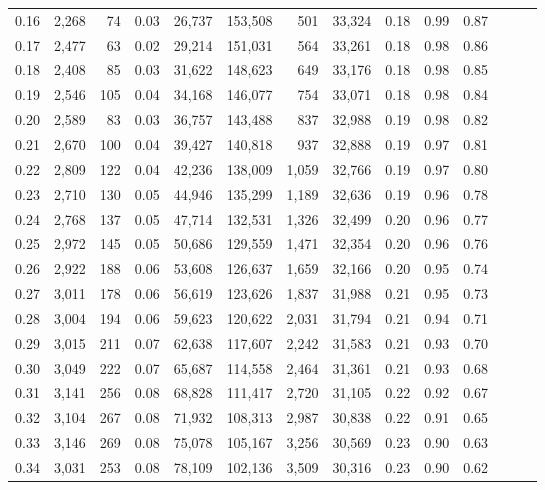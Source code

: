 \begin{tabular}{rrrrrrrrrrrrrr}
0.16 &  2,268 &   74 &  0.03 &   26,737 &  153,508 &     501 &  33,324 &  0.18 &  0.99 &      0.87 \\
0.17 &  2,477 &   63 &  0.02 &   29,214 &  151,031 &     564 &  33,261 &  0.18 &  0.98 &      0.86 \\
0.18 &  2,408 &   85 &  0.03 &   31,622 &  148,623 &     649 &  33,176 &  0.18 &  0.98 &      0.85 \\
0.19 &  2,546 &  105 &  0.04 &   34,168 &  146,077 &     754 &  33,071 &  0.18 &  0.98 &      0.84 \\
0.20 &  2,589 &   83 &  0.03 &   36,757 &  143,488 &     837 &  32,988 &  0.19 &  0.98 &      0.82 \\
0.21 &  2,670 &  100 &  0.04 &   39,427 &  140,818 &     937 &  32,888 &  0.19 &  0.97 &      0.81 \\
0.22 &  2,809 &  122 &  0.04 &   42,236 &  138,009 &   1,059 &  32,766 &  0.19 &  0.97 &      0.80 \\
0.23 &  2,710 &  130 &  0.05 &   44,946 &  135,299 &   1,189 &  32,636 &  0.19 &  0.96 &      0.78 \\
0.24 &  2,768 &  137 &  0.05 &   47,714 &  132,531 &   1,326 &  32,499 &  0.20 &  0.96 &      0.77 \\
0.25 &  2,972 &  145 &  0.05 &   50,686 &  129,559 &   1,471 &  32,354 &  0.20 &  0.96 &      0.76 \\
0.26 &  2,922 &  188 &  0.06 &   53,608 &  126,637 &   1,659 &  32,166 &  0.20 &  0.95 &      0.74 \\
0.27 &  3,011 &  178 &  0.06 &   56,619 &  123,626 &   1,837 &  31,988 &  0.21 &  0.95 &      0.73 \\
0.28 &  3,004 &  194 &  0.06 &   59,623 &  120,622 &   2,031 &  31,794 &  0.21 &  0.94 &      0.71 \\
0.29 &  3,015 &  211 &  0.07 &   62,638 &  117,607 &   2,242 &  31,583 &  0.21 &  0.93 &      0.70 \\
0.30 &  3,049 &  222 &  0.07 &   65,687 &  114,558 &   2,464 &  31,361 &  0.21 &  0.93 &      0.68 \\
0.31 &  3,141 &  256 &  0.08 &   68,828 &  111,417 &   2,720 &  31,105 &  0.22 &  0.92 &      0.67 \\
0.32 &  3,104 &  267 &  0.08 &   71,932 &  108,313 &   2,987 &  30,838 &  0.22 &  0.91 &      0.65 \\
0.33 &  3,146 &  269 &  0.08 &   75,078 &  105,167 &   3,256 &  30,569 &  0.23 &  0.90 &      0.63 \\
0.34 &  3,031 &  253 &  0.08 &   78,109 &  102,136 &   3,509 &  30,316 &  0.23 &  0.90 &      0.62 \\

\end{tabular}

